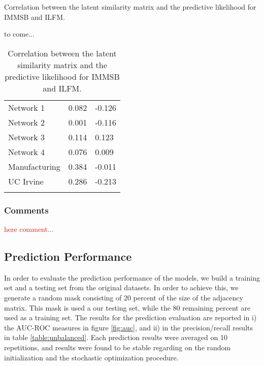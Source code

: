 \documentclass[a4paper, 12pt]{article}
\begin{document}
\begin{table}
    \caption{Correlation between the latent similarity matrix and the predictive likelihood for IMMSB and ILFM.}
    \label{table:homo_conting}

    to come...


\end{table}

\begin{table}
    \caption{Correlation between the latent similarity matrix and the predictive likelihood for IMMSB and ILFM.}
    \begin{tabular}{lll}
    \hline
    \hline
    Network 1     & 0.082 &  -0.126   \\
    Network 2     & 0.001     &  -0.116   \\
    Network 3     & 0.114     &  0.123    \\
    Network 4     & 0.076     &  0.009    \\
    Manufacturing & 0.384     &  -0.011   \\
    UC Irvine     & 0.286     &  -0.213   \\
    \hline
    \label{table:homo_latent}
    \end{tabular}
\end{table}


\subsubsection{Comments}
\textcolor{red}{here comment...} 



\subsection{Prediction Performance}
In order to evaluate the  prediction performance of the models, we build a training set and a testing set from the original datasets. In order to achieve this, we generate a random mask consisting of 20 percent of the size of the adjacency matrix. This mask is used a our testing set, while the 80 remaining percent are used as a training set. The results for the prediction evaluation are reported in i) the AUC-ROC measures in figure \ref{fig:auc}, and ii) in the precision/recall results in table \ref{table:unbalanced}.
Each prediction results were averaged on 10 repetitions, and results were found to be stable regarding on the random  initialization and the stochastic optimization procedure. 
\end{document}

